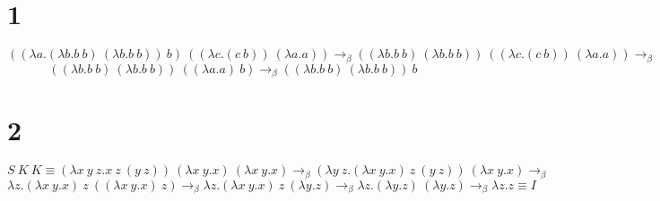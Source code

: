 \documentclass{article}
\begin{document}
\section*{1}

$$((\lambda a.(\lambda b.b\ b)\ (\lambda b.b\ b))\ b)\ ((\lambda c.(c\ b))\ (\lambda a.a)) \rightarrow_\beta
((\lambda b.b\ b)\ (\lambda b.b\ b))\ ((\lambda c.(c\ b))\ (\lambda a.a)) \rightarrow_\beta$$
$$((\lambda b.b\ b)\ (\lambda b.b\ b))\ ((\lambda a.a)\ b) \rightarrow_\beta
((\lambda b.b\ b)\ (\lambda b.b\ b))\ b$$

\section*{2}

$$S\ K\ K \equiv (\lambda x\ y\ z.x\ z\ (y\ z))\ (\lambda x\ y.x)\ (\lambda x\ y.x) \rightarrow_\beta
(\lambda y\ z.(\lambda x\ y.x)\ z\ (y\ z))\ (\lambda x\ y.x) \rightarrow_\beta$$
$$\lambda z.(\lambda x\ y.x)\ z\ ((\lambda x\ y.x)\ z) \rightarrow_\beta 
\lambda z.(\lambda x\ y.x)\ z\ (\lambda y.z) \rightarrow_\beta
\lambda z.(\lambda y.z)\ (\lambda y.z) \rightarrow_\beta
\lambda z.z \equiv I$$
\end{document}
